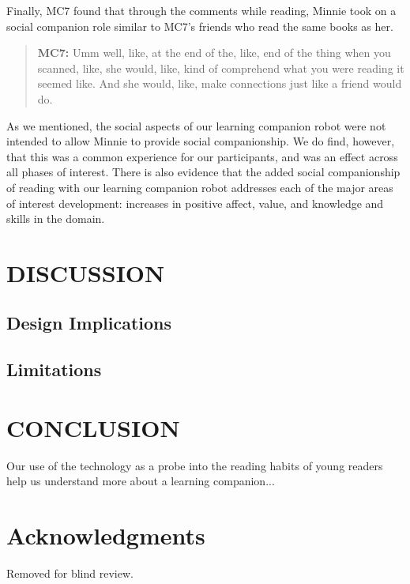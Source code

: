 \documentclass{sigchi}
\begin{document}
 Finally, MC7 found that through the comments while reading, Minnie took on a social companion role similar to MC7's friends who read the same books as her.
 
	 \begin{quote}
	 	  \textbf{MC7:} Umm well, like, at the end of the, like, end of the thing when you scanned, like, she would, like, kind of comprehend what you were reading it seemed like. And she would, like, make connections just like a friend would do. 
	 	  
	 \end{quote}
 
As we mentioned, the social aspects of our learning companion robot were not intended to allow Minnie to provide social companionship.  We do find, however, that this was a common experience for our participants, and was an effect across all phases of interest.  There is also evidence that the added social companionship of reading with our learning companion robot addresses each of the major areas of interest development: increases in positive affect, value, and knowledge and skills in the domain.  

\section{DISCUSSION}

\subsection{Design Implications}

\subsection{Limitations}

\section{CONCLUSION}
Our use of the technology as a probe into the reading habits of young readers help us understand more about a learning companion...


\section{Acknowledgments}
Removed for blind review.

\balance{}



\end{document}
